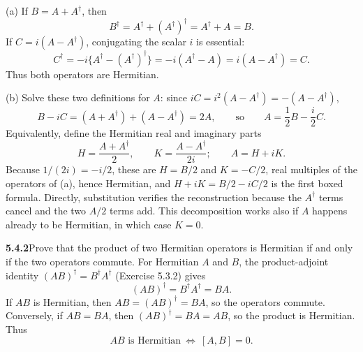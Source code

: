(a) If $B=A+A^\dagger$, then
\[
B^\dagger=A^\dagger+(A^\dagger)^\dagger=A^\dagger+A=B.
\]
If $C=i(A-A^\dagger)$, conjugating the scalar $i$ is essential:
\[
C^\dagger=-i\{A^\dagger-(A^\dagger)^\dagger\}
=-i(A^\dagger-A)=i(A-A^\dagger)=C.
\]
Thus both operators are Hermitian.

(b) Solve these two definitions for $A$: since
$iC=i^2(A-A^\dagger)=-(A-A^\dagger)$,
\[
B-iC=(A+A^\dagger)+(A-A^\dagger)=2A,\qquad\text{so}\qquad
\boxed{A=\frac12B-\frac i2C.}
\]
Equivalently, define the Hermitian real and imaginary parts
\[
H=\frac{A+A^\dagger}{2},\qquad
K=\frac{A-A^\dagger}{2i};\qquad \boxed{A=H+iK}.
\]
Because $1/(2i)=-i/2$, these are $H=B/2$ and $K=-C/2$, real multiples
of the operators of (a), hence Hermitian, and $H+iK=B/2-iC/2$ is the
first boxed formula. Directly, substitution verifies the reconstruction
because the $A^\dagger$ terms cancel and the two $A/2$ terms add. This
decomposition works also if $A$ happens already to be Hermitian, in
which case $K=0$.

\par\bigskip
\noindent\textbf{5.4.2}\quad Prove that the product of two
 Hermitian operators is Hermitian
if and only if the two operators commute.
\solution
For Hermitian $A$ and $B$, the product-adjoint identity
$(AB)^\dagger=B^\dagger A^\dagger$ (Exercise 5.3.2) gives
\[
(AB)^\dagger=B^\dagger A^\dagger=BA.
\]
If $AB$ is Hermitian, then $AB=(AB)^\dagger=BA$, so the operators
commute. Conversely, if $AB=BA$, then
$(AB)^\dagger=BA=AB$, so the product is Hermitian. Thus
\[
\boxed{AB\text{ is Hermitian}\ \Longleftrightarrow\ [A,B]=0.}
\]

